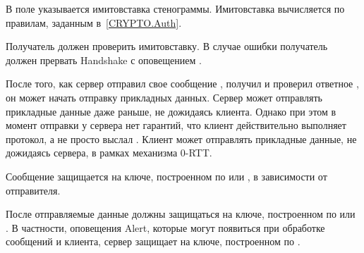В поле  указывается имитовставка стенограммы. 
Имитовставка вычисляется по правилам, заданным в~\ref{CRYPTO.Auth}.

Получатель  должен проверить имитовставку.
В случае ошибки получатель должен прервать Handshake с 
оповещением . 

После того, как сервер отправил свое сообщение , получил и 
проверил ответное , он может начать отправку прикладных данных. 
%
Сервер может отправлять прикладные данные даже раньше, не дожидаясь  
клиента. Однако при этом в момент отправки у сервера нет гарантий, что клиент 
действительно выполняет протокол, а не просто выслал 
.
%
Клиент может отправлять прикладные данные, не дожидаясь  
сервера, в рамках механизма 0-RTT.

Сообщение  защищается на ключе, построенном по  
 или , в 
зависимости от отправителя.

После  отправляемые данные должны защищаться на ключе,
построенном по  или 
.
%
В частности, оповещения Alert, которые могут появиться при обработке сообщений 
 и  клиента,
сервер защищает на ключе, построенном по .
